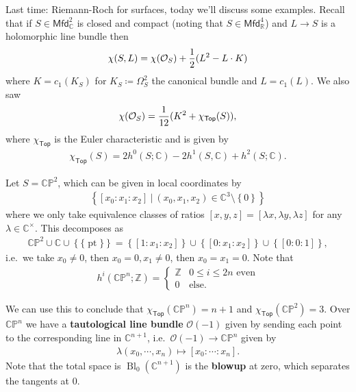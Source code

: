 \begin{remark}

Last time: Riemann-Roch for surfaces, today we'll discuss some examples.
Recall that if \(S \in {\mathsf{Mfd}}_{\mathbb{C}}^2\) is closed and
compact (noting that \(S\in {\mathsf{Mfd}}_{\mathbb{R}}^4\)) and
\(L\to S\) is a holomorphic line bundle then
\begin{align*}
\chi(S, L) = \chi({\mathcal{O}}_S) + {1\over 2}(L^2 - L \cdot K)
\end{align*}
where \(K = c_1(K_S)\) for \(K_S \coloneqq\Omega_S^2\) the canonical
bundle and \(L = c_1(L)\). We also saw
\begin{align*}
\chi({\mathcal{O}}_S) = {1\over 12}(K^2 + \chi_{{\mathsf{Top}}}(S))
,\end{align*}
where \(\chi_{\mathsf{Top}}\) is the Euler characteristic and is given
by
\begin{align*}
\chi_{\mathsf{Top}}(S) = 2 h^0(S; {\mathbb{C}}) - 2 h^1(S, {\mathbb{C}}) + h^2(S; {\mathbb{C}})
.\end{align*}

\end{remark}

\begin{example}[?]

Let \(S = {\mathbb{CP}}^2\), which can be given in local coordinates by
\begin{align*} 
\left\{{ [x_0: x_1: x_2 ] {~\mathrel{\Big|}~}(x_0, x_1, x_2) \in {\mathbb{C}}^3\setminus\left\{{0}\right\}}\right\} 
\end{align*}
where we only take equivalence classes of ratios
\([x,y,z] = [\lambda x, \lambda y, \lambda z]\) for any
\(\lambda\in {\mathbb{C}}^{\times}\). This decomposes as
\begin{align*}
{\mathbb{CP}}^2 \cup{\mathbb{C}}\cup\left\{{ {\{\operatorname{pt}\}}}\right\} = \left\{{ [1: x_1: x_2] }\right\} \cup\left\{{ [0 : x_1: x_2] }\right\} \cup\left\{{ [0:0:1] }\right\}
,\end{align*}
i.e.~we take \(x_0 \neq 0\), then \(x_0 = 0, x_1\neq 0\), then
\(x_0 = x_1 = 0\). Note that
\begin{align*}
h^i({\mathbb{CP}}^n; {\mathbb{Z}}) = 
\begin{cases}
{\mathbb{Z}}&  0 \leq i \leq 2n \text{ even} 
\\
0 & \text{else}.
\end{cases}
\end{align*}

We can use this to conclude that
\(\chi_{\mathsf{Top}}({\mathbb{CP}}^n) = n+1\) and
\(\chi_{\mathsf{Top}}({\mathbb{CP}}^2) = 3\). Over \({\mathbb{CP}}^n\)
we have a \textbf{tautological line bundle} \({\mathcal{O}}(-1)\) given
by sending each point to the corresponding line in
\({\mathbb{C}}^{n+1}\), i.e.~\({\mathcal{O}}(-1) \to {\mathbb{CP}}^n\)
given by
\begin{align*}
\lambda (x_0, \cdots, x_n) \mapsto [x_0: \cdots: x_n]
.\end{align*}
Note that the total space is \(\operatorname{Bl}_0({\mathbb{C}}^{n+1})\)
is the \textbf{blowup} at zero, which separates the tangents at 0.

\end{example}

